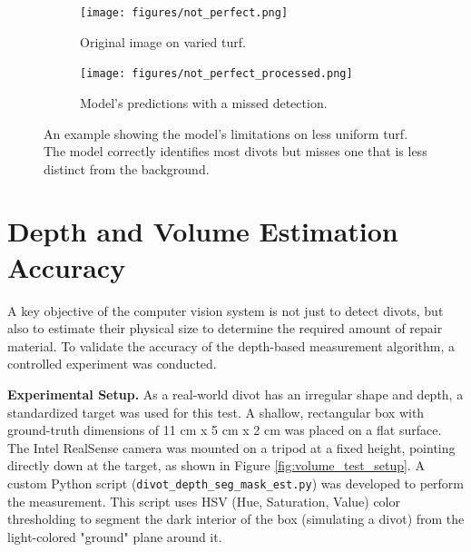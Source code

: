 \begin{figure}[h!]
    \centering
    \begin{subfigure}[b]{0.49\textwidth}
        \centering
        \texttt{[image: figures/not\_perfect.png]} 
        \caption{Original image on varied turf.}
        \label{fig:bad_original}
    \end{subfigure}
    \hfill 
    \begin{subfigure}[b]{0.49\textwidth}
        \centering
        \texttt{[image: figures/not\_perfect\_processed.png]} 
        \caption{Model's predictions with a missed detection.}
        \label{fig:bad_prediction}
    \end{subfigure}
    \caption[Limitations of divot detection on varied turf.] 
    {An example showing the model's limitations on less uniform turf. The model correctly identifies most divots but misses one that is less distinct from the background.}
    \label{fig:real_world_bad}
\end{figure}

\section{Depth and Volume Estimation Accuracy}
\label{sec:volume_evaluation}
A key objective of the computer vision system is not just to detect divots, but also to estimate their physical size to determine the required amount of repair material. To validate the accuracy of the depth-based measurement algorithm, a controlled experiment was conducted.

\textbf{Experimental Setup.}
As a real-world divot has an irregular shape and depth, a standardized target was used for this test. A shallow, rectangular box with ground-truth dimensions of 11 cm x 5 cm x 2 cm was placed on a flat surface. The Intel RealSense camera was mounted on a tripod at a fixed height, pointing directly down at the target, as shown in Figure \ref{fig:volume_test_setup}. A custom Python script (\texttt{divot\_depth\_seg\_mask\_est.py}) was developed to perform the measurement. This script uses HSV (Hue, Saturation, Value) color thresholding to segment the dark interior of the box (simulating a divot) from the light-colored "ground" plane around it.

